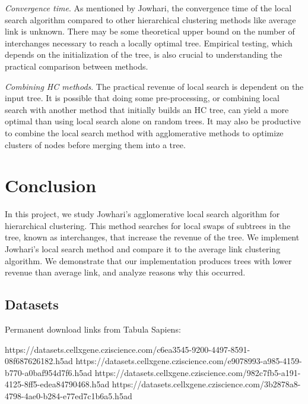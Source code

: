 \documentclass[unnumsec,webpdf,contemporary,large,numbered]{oup-authoring-template}%
\theoremstyle{thmstyleone}%
\theoremstyle{thmstyletwo}%
\theoremstyle{thmstylethree}%
\begin{document}
\textit{Convergence time}. As mentioned by Jowhari, the convergence time of the local search algorithm compared to other hierarchical clustering methods like average link is unknown. There may be some theoretical upper bound on the number of interchanges necessary to reach a locally optimal tree. Empirical testing, which depends on the initialization of the tree, is also crucial to understanding the practical comparison between methods.

\textit{Combining HC methods}. The practical revenue of local search is dependent on the input tree. It is possible that doing some pre-processing, or combining local search with another method that initially builds an HC tree, can yield a more optimal  than using local search alone on random trees. It may also be productive to combine the local search method with agglomerative methods to optimize clusters of nodes before merging them into a tree.

\section{Conclusion}
In this project, we study Jowhari's agglomerative local search algorithm for hierarchical clustering.
This method searches for local swaps of subtrees in the tree, known as interchanges, that increase the revenue of the tree.
We implement Jowhari's local search method and compare it to the average link clustering algorithm. We demonstrate that our implementation produces trees with lower revenue than  average link, and analyze reasons why this occurred.


 


\begin{appendices}

\section{Datasets}
Permanent download links from Tabula Sapiens:

\noindent
https://datasets.cellxgene.cziscience.com/c6ea3545-9200-4497-8591-08f687626182.h5ad
\noindent
https://datasets.cellxgene.cziscience.com/e9078993-a985-4159-b770-a0baf954d7f6.h5ad
\noindent
https://datasets.cellxgene.cziscience.com/982c7fb5-a191-4125-8ff5-edea84790468.h5ad
\noindent
https://datasets.cellxgene.cziscience.com/3b2878a8-4798-4ae0-b284-e77ed7c1b6a5.h5ad
\end{appendices}
\end{document}
